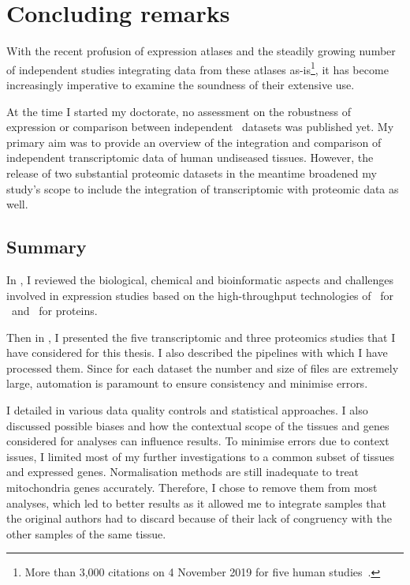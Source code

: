 \chapter{Concluding remarks}\label{ch:conclusion}

\setlength{\epigraphwidth}{0.49\textwidth}%
    \setlength{\epigraphrule}{0pt}%

With the recent profusion of expression atlases
and the steadily growing number of independent studies
integrating data from these atlases as-is\footnote{%
More than 3,000 citations on 4 November 2019 for five human studies~\cite{%
castleData,VTpaper,Uhlen2014,Uhlen2015,GTExTranscript}.},
it has become increasingly imperative to examine
the soundness of their extensive use.\mybr\

At the time I started my doctorate,
no assessment on the robustness of expression or
comparison between independent \Rnaseq\ datasets was published yet.
My primary aim was to provide an overview
of the integration and comparison of independent transcriptomic data
of human undiseased tissues.
However, the release of two substantial proteomic datasets in the meantime
broadened my study's scope
to include the integration of transcriptomic with proteomic data as well.\mybr\

\section*{Summary}
In ,
I reviewed the biological, chemical and bioinformatic aspects and challenges
involved in expression studies based on the high-throughput technologies
of \Rnaseq\ for \mRNAs\ and \ms\ for proteins.\mybr\

Then in ,
I presented the five transcriptomic and three proteomics studies
that I have considered for this thesis.
I also described the pipelines with which I have processed them.
Since for each dataset the number and size of files are extremely large,
automation is paramount to ensure consistency and minimise errors.\mybr\

I detailed in  various data quality controls
and statistical approaches.
I also discussed possible biases and
how the contextual scope of the tissues and genes considered for analyses
can influence results.
To minimise errors due to context issues,
I limited most of my further investigations to
a common subset of tissues and expressed genes.
Normalisation methods are still inadequate
to treat mitochondria genes accurately.
Therefore, I chose to remove them from most analyses,
which led to better results
as it allowed me to integrate samples
that the original authors had to discard
because of their lack of congruency with the other samples of the same tissue.\mybr\

